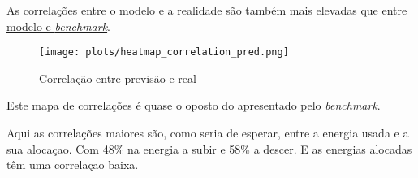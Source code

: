 As correlações entre o modelo e a realidade são também mais elevadas que entre \hyperref[fig:featurecorrelation]{modelo e \textit{benchmark}}.


\begin{figure}[H]
    \centering
    \texttt{[image: plots/heatmap\_correlation\_pred.png]}
    \caption{Correlação entre previsão e real}
    \label{fig:predcorrelation}
  \end{figure}

Este mapa de correlações é quase o oposto do apresentado pelo \hyperref[fig:benchmarkcorr]{\textit{benchmark}}.\par
Aqui as correlações maiores são, como seria de esperar, entre a energia usada e a sua alocaçao. Com 48\% na energia a subir e 58\% a descer. E as energias alocadas têm uma correlaçao baixa.\par 